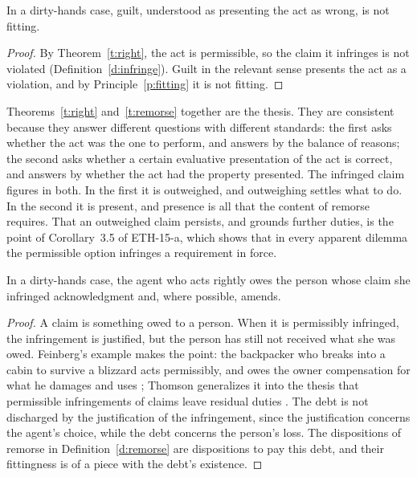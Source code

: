 \documentclass{situationist-preprint}
\begin{document}
\begin{corollary}\label{c:guilt}
In a dirty-hands case, guilt, understood as presenting the act as wrong, is not fitting.
\end{corollary}

\begin{proof}
By Theorem~\ref{t:right}, the act is permissible, so the claim it infringes is not violated (Definition~\ref{d:infringe}). Guilt in the relevant sense presents the act as a violation, and by Principle~\ref{p:fitting} it is not fitting.
\end{proof}

Theorems~\ref{t:right} and~\ref{t:remorse} together are the thesis. They are consistent because they answer different questions with different standards: the first asks whether the act was the one to perform, and answers by the balance of reasons; the second asks whether a certain evaluative presentation of the act is correct, and answers by whether the act had the property presented. The infringed claim figures in both. In the first it is outweighed, and outweighing settles what to do. In the second it is present, and presence is all that the content of remorse requires. That an outweighed claim persists, and grounds further duties, is the point of Corollary~3.5 of ETH-15-a, which shows that in every apparent dilemma the permissible option infringes a requirement in force.

\begin{proposition}\label{p:amends}
In a dirty-hands case, the agent who acts rightly owes the person whose claim she infringed acknowledgment and, where possible, amends.
\end{proposition}

\begin{proof}
A claim is something owed to a person. When it is permissibly infringed, the infringement is justified, but the person has still not received what she was owed. Feinberg's example makes the point: the backpacker who breaks into a cabin to survive a blizzard acts permissibly, and owes the owner compensation for what he damages and uses \citep{Feinberg1978}; Thomson generalizes it into the thesis that permissible infringements of claims leave residual duties \citep[ch.~3]{Thomson1990}. The debt is not discharged by the justification of the infringement, since the justification concerns the agent's choice, while the debt concerns the person's loss. The dispositions of remorse in Definition~\ref{d:remorse} are dispositions to pay this debt, and their fittingness is of a piece with the debt's existence.
\end{proof}
\end{document}
